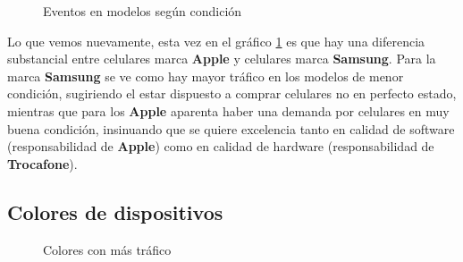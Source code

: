 \documentclass[a4paper]{article}
\begin{document}
\begin{figure}[h!]
	\caption{Eventos en modelos según condición}
	\label{fig:prominentescondicion}
\end{figure}

Lo que vemos nuevamente, esta vez en el gráfico \ref{fig:prominentescondicion} es que hay una diferencia substancial entre celulares marca \textbf{Apple} y celulares marca \textbf{Samsung}. Para la marca \textbf{Samsung} se ve como hay mayor tráfico en los modelos de menor condición, sugiriendo el estar dispuesto a comprar celulares no en perfecto estado, mientras que para los \textbf{Apple} aparenta haber una demanda por celulares en muy buena condición, insinuando que se quiere excelencia tanto en calidad de software (responsabilidad de \textbf{Apple}) como en calidad de hardware (responsabilidad de \textbf{Trocafone}).

\subsection{Colores de dispositivos}

\begin{figure}[h!]
	\caption{Colores con más tráfico}
	\label{fig:colores}
\end{figure}
\end{document}
